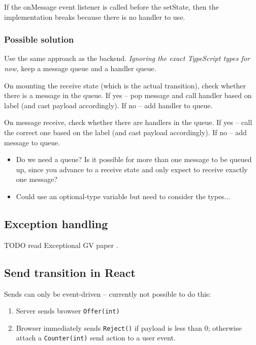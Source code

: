 \documentclass{article}
\begin{document}
If the onMessage event listener
is called before the setState,
then the implementation breaks because there is no
handler to use.

\subsubsection*{Possible solution}

Use the same approach as the backend.
\textit{Ignoring the exact TypeScript types for now,}
keep a message queue and a handler queue.

On mounting the receive state (which is the actual
transition), check whether there is a message in the 
queue.
If yes -- pop message and call handler based on label
(and cast payload accordingly).
If no -- add handler to queue.

On message receive, check whether there are handlers
in the queue. 
If yes -- call the correct one based on
the label (and cast payload accordingly).
If no -- add message to queue.

\begin{itemize}
\item
Do we need a queue? Is it possible for more than
one message to be queued up, since you advance to
a receive state and only expect to receive exactly
one message? 

\item
Could use an optional-type variable
but need to consider the types...
\end{itemize}

\subsection*{Exception handling}

TODO read Exceptional GV paper \cite{ExceptionalGV}.

\subsection*{Send transition in React}
Sends can only be event-driven --
currently not possible to do this:

\begin{enumerate}
\item Server sends browser 
\texttt{Offer(int)}
\item Browser immediately sends 
\texttt{Reject()} if payload is less than 0;
otherwise attach a \texttt{Counter(int)} 
send action to a user event.
\end{enumerate}
\end{document}
